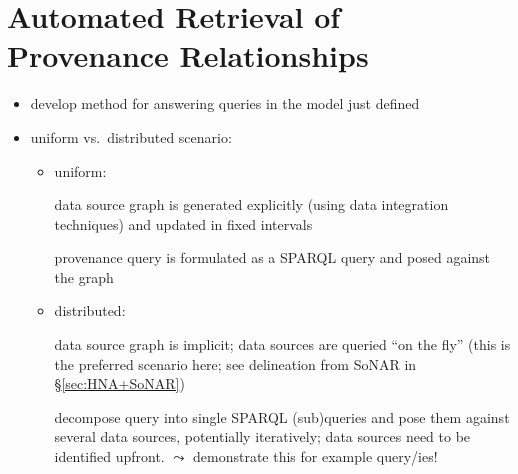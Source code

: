 \chapter{Automated Retrieval of Provenance Relationships}
\label{chap:retrieval}

\begin{itemize}
  \item
    develop method for answering queries in the model just defined
  \item
    uniform vs.\ distributed scenario:
    \begin{itemize}
      \item
        uniform: 
        
        data source graph is generated explicitly (using data integration techniques)
        and updated in fixed intervals
                
        provenance query is formulated as a \gls{SPARQL} query and posed against the graph
      \item
        distributed: 
        
        data source graph is implicit; data sources are queried \enquote{on the fly}
        (this is the preferred scenario here; see delineation from SoNAR in §\ref{sec:HNA+SoNAR})
        
        decompose query into single \gls{SPARQL} (sub)queries and pose them against several data sources,
        potentially iteratively;
        data sources need to be identified upfront.
        $\leadsto$ demonstrate this for example query/ies!
        
    \end{itemize}
\end{itemize}
